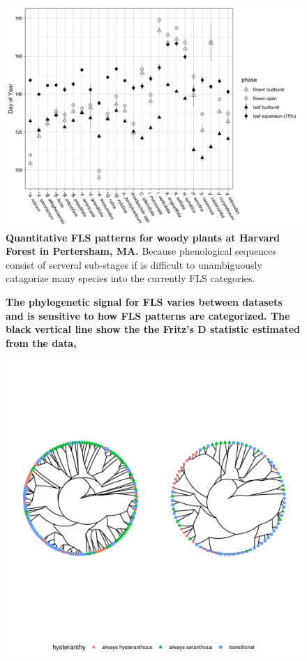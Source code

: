 \documentclass[12pt]{article}\usepackage[]{graphicx}\usepackage[]{color}
\begin{document}
{\begin{figure}[h!]
    \centering
 \includegraphics[width=\textwidth]{..//HarvardForest/HFmeans_expanded.jpeg} 
    \caption{\textbf{Quantitative FLS patterns for woody plants at Harvard Forest in Pertersham, MA.} Because phenological sequences consist of serveral sub-stages if is difficult to unambiguously catagorize many species into the currently FLS categories. }
    \label{fig:HFmeans}
\end{figure}

\pagebreak
\begin{figure}

  \caption{\textbf{The phylogenetic signal for FLS varies between datasets and is sensitive to how FLS patterns are categorized. The black vertical line show the the Fritz's D statistic estimated from the data,}}
    \label{fig:Dstat}
    \end{figure}

\pagebreak
\begin{figure}[H]

\includegraphics[width=7.5in]{figure/Code_chunk_Minimal_example3-1} 


\end{figure}}
\end{document}
